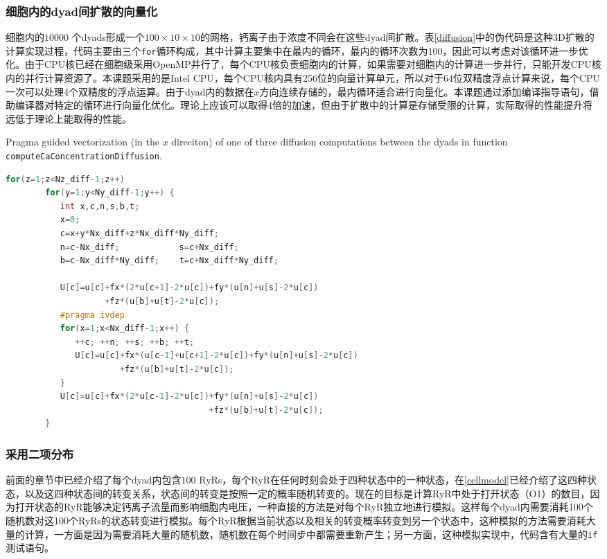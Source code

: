 \subsubsection{细胞内的dyad间扩散的向量化}
细胞内的$10000$ 个dyads形成一个$100\times10\times10$的网格，钙离子由于浓度不同会在这些dyad间扩散。表\ref{diffusion}中的伪代码是这种3D扩散的计算实现过程，代码主要由三个{\tt for}循环构成，其中计算主要集中在最内的循环，最内的循环次数为$100$，因此可以考虑对该循环进一步优化。由于CPU核已经在细胞级采用OpenMP并行了，每个CPU核负责细胞内的计算，如果需要对细胞内的计算进一步并行，只能开发CPU核内的并行计算资源了。本课题采用的是Intel CPU，每个CPU核内具有256位的向量计算单元，所以对于64位双精度浮点计算来说，每个CPU一次可以处理4个双精度的浮点运算。由于dyad内的数据在$x$方向连续存储的，最内循环适合进行向量化。本课题通过添加编译指导语句，借助编译器对特定的循环进行向量化优化。理论上应该可以取得4倍的加速，但由于扩散中的计算是存储受限的计算，实际取得的性能提升将远低于理论上能取得的性能。

 \begin{table}
\caption{Pragma guided vectorization (in the $x$ direciton) of one of three diffusion computations between the dyads in function {\tt computeCaConcentrationDiffusion}.}
\label{diffusion}
\begin{lstlisting}[language=C++, basicstyle=\ttfamily\footnotesize]
for(z=1;z<Nz_diff-1;z++)
        for(y=1;y<Ny_diff-1;y++) {     
           int x,c,n,s,b,t;         
           x=0;
           c=x+y*Nx_diff+z*Nx_diff*Ny_diff;
           n=c-Nx_diff;            s=c+Nx_diff;
           b=c-Nx_diff*Ny_diff;    t=c+Nx_diff*Ny_diff; 
           
           U[c]=u[c]+fx*(2*u[c+1]-2*u[c])+fy*(u[n]+u[s]-2*u[c])
                    +fz*(u[b]+u[t]-2*u[c]);
           #pragma ivdep
           for(x=1;x<Nx_diff-1;x++) {
              ++c; ++n; ++s; ++b; ++t;
              U[c]=u[c]+fx*(u[c-1]+u[c+1]-2*u[c])+fy*(u[n]+u[s]-2*u[c])
                       +fz*(u[b]+u[t]-2*u[c]);              
           }
           U[c]=u[c]+fx*(2*u[c-1]-2*u[c])+fy*(u[n]+u[s]-2*u[c])
                                         +fz*(u[b]+u[t]-2*u[c]);
        }   \end{lstlisting}
\end{table}


\subsubsection{采用二项分布}
\label{binom}
%
前面的章节中已经介绍了每个dyad内包含$100$ RyRs，每个RyR在任何时刻会处于四种状态中的一种状态，在\ref{cellmodel}已经介绍了这四种状态，以及这四种状态间的转变关系，状态间的转变是按照一定的概率随机转变的。现在的目标是计算RyR中处于打开状态（O1）的数目，因为打开状态的RyR能够决定钙离子流量而影响细胞内电压，一种直接的方法是对每个RyR独立地进行模拟。这样每个dyad内需要消耗100个随机数对这100个RyRs的状态转变进行模拟。每个RyR根据当前状态以及相关的转变概率转变到另一个状态中，这种模拟的方法需要消耗大量的计算，一方面是因为需要消耗大量的随机数，随机数在每个时间步中都需要重新产生；另一方面，这种模拟实现中，代码含有大量的{\tt if}测试语句。

